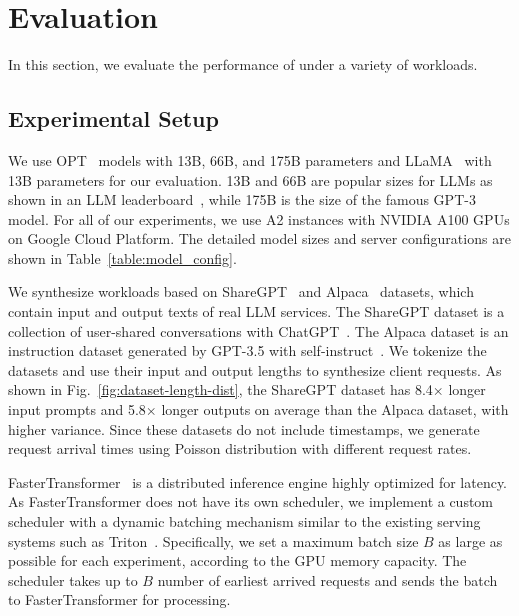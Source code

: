 \section{Evaluation}
\label{sec:eval}

In this section, we evaluate the performance of \sys under a variety of workloads.

\subsection{Experimental Setup}
\label{subsec:exp-setup}

We use OPT~\cite{zhang2022opt} models with 13B, 66B, and 175B parameters and LLaMA~\cite{touvron2023llama} with 13B parameters for our evaluation.
13B and 66B are popular sizes for LLMs as shown in an LLM leaderboard~\cite{lmsysweek8}, while 175B is the size of the famous GPT-3~\cite{brown2020language} model.
For all of our experiments, we use A2 instances with NVIDIA A100 GPUs on Google Cloud Platform.
The detailed model sizes and server configurations are shown in Table~\ref{table:model_config}.


We synthesize workloads based on ShareGPT~\cite{sharegpt} and Alpaca~\cite{alpaca} datasets, which contain input and output texts of real LLM services.
The ShareGPT dataset is a collection of user-shared conversations with ChatGPT~\cite{chatgpt}.
The Alpaca dataset is an instruction dataset generated by GPT-3.5 with self-instruct~\cite{wang2022self}.
We tokenize the datasets and use their input and output lengths to synthesize client requests.
As shown in Fig.~\ref{fig:dataset-length-dist}, the ShareGPT dataset has 8.4$\times$ longer input prompts and 5.8$\times$ longer outputs on average than the Alpaca dataset, with higher variance.
Since these datasets do not include timestamps, we generate request arrival times using Poisson distribution with different request rates.

FasterTransformer~\cite{nvidiaft} is a distributed inference engine highly optimized for latency.
As FasterTransformer does not have its own scheduler, we implement a custom scheduler with a dynamic batching mechanism similar to the existing serving systems such as Triton~\cite{nvidiatriton}.
Specifically, we set a maximum batch size $B$ as large as possible for each experiment, according to the GPU memory capacity.
The scheduler takes up to $B$ number of earliest arrived requests and sends the batch to FasterTransformer for processing.

